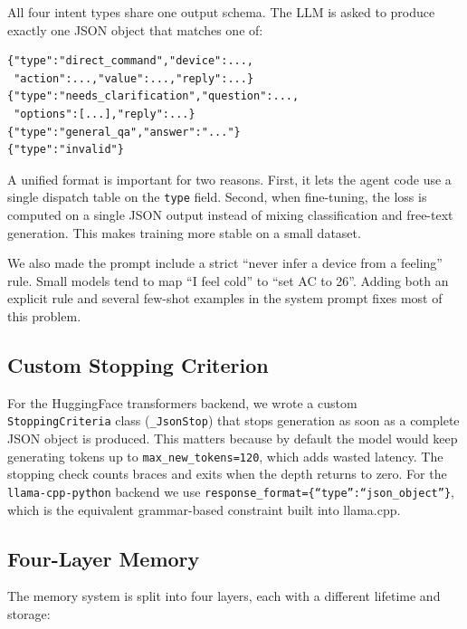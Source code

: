 \documentclass[conference]{IEEEtran}
\begin{document}
All four intent types share one output schema. The LLM is asked to produce exactly one JSON object that matches one of:

\begin{lstlisting}[basicstyle=\ttfamily\scriptsize]
{"type":"direct_command","device":...,
 "action":...,"value":...,"reply":...}
{"type":"needs_clarification","question":...,
 "options":[...],"reply":...}
{"type":"general_qa","answer":"..."}
{"type":"invalid"}
\end{lstlisting}

A unified format is important for two reasons. First, it lets the agent code use a single dispatch table on the \texttt{type} field. Second, when fine-tuning, the loss is computed on a single JSON output instead of mixing classification and free-text generation. This makes training more stable on a small dataset.

We also made the prompt include a strict ``never infer a device from a feeling'' rule. Small models tend to map ``I feel cold'' to ``set AC to 26''. Adding both an explicit rule and several few-shot examples in the system prompt fixes most of this problem.

\subsection{Custom Stopping Criterion}

For the HuggingFace transformers backend, we wrote a custom \texttt{StoppingCriteria} class (\texttt{\_JsonStop}) that stops generation as soon as a complete JSON object is produced. This matters because by default the model would keep generating tokens up to \texttt{max\_new\_tokens=120}, which adds wasted latency. The stopping check counts braces and exits when the depth returns to zero. For the \texttt{llama-cpp-python} backend we use \texttt{response\_format=\{``type'':``json\_object''\}}, which is the equivalent grammar-based constraint built into llama.cpp.

\subsection{Four-Layer Memory}
\label{ssec:memory}

The memory system is split into four layers, each with a different lifetime and storage:
\end{document}
